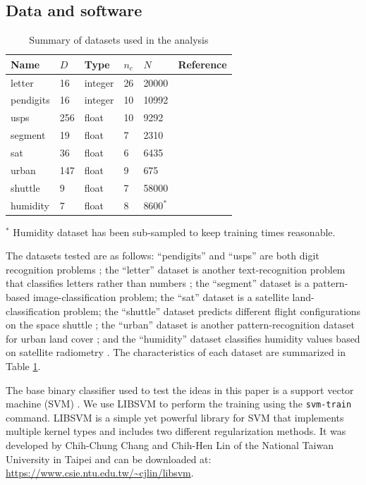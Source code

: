 \subsection{Data and software}

\begin{table}
	\caption{Summary of datasets used in the analysis}\label{datasets}
	\begin{tabular}{|l|lllll|}
	\hline
	Name & $D$ & Type & $n_c$ & $N$ & Reference \\\hline \hline
	letter &  16 & integer & 26 & 20000 & {\small \citep{Frey_Slate1991}}\\
	pendigits & 16 & integer & 10 & 10992 & {\small \citep{Alimoglu1996}}\\
	usps & 256 & float & 10 & 9292 & {\small \citep{Hull1994}}\\
	segment & 19 & float & 7 & 2310 & {\small \citep{King_etal1995}} \\
	sat & 36 & float & 6 & 6435 & {\small \citep{King_etal1995}}\\
	urban & 147 & float & 9 & 675 & {\small \citep{Johnson2013}} \\
	shuttle & 9 & float & 7 & 58000 & {\small \citep{King_etal1995}}\\
	humidity & 7 & float & 8 & 8600$^*$ & {\small \citep{Mills2009}} \\
	\hline
\end{tabular}
	\vspace{1 ex}

	\raggedright $^*$ Humidity dataset has been sub-sampled to keep training times reasonable.
\end{table}

The datasets tested are as follows: 
``pendigits'' and ``usps'' are both digit recognition problems 
\citep{Alimoglu1996, Hull1994};
the ``letter'' dataset is another text-recognition problem 
that classifies letters rather than numbers 
\citep{Frey_Slate1991};
the ``segment'' dataset is a pattern-based image-classification problem;
the ``sat'' dataset is a satellite land-classification problem;
the ``shuttle'' dataset predicts different flight configurations on the
space shuttle \citep{Michie_etal1994, King_etal1995};
the ``urban'' dataset is another pattern-recognition dataset for urban land cover
\citep{Johnson2013};
and the ``humidity'' dataset classifies humidity values based on satellite
radiometry \citep{Mills2009}.
The characteristics of each dataset are summarized in Table \ref{datasets}.

The base binary classifier used to test the ideas in this paper is a 
support vector machine (SVM) \citep{Mueller_etal2001}.
We use LIBSVM \citep{Chang_Lin2011} to perform the training
using the \verb/svm-train/ command.
LIBSVM is a simple yet powerful library for SVM that implements multiple
kernel types and includes two different regularization methods.
It was developed by Chih-Chung Chang and Chih-Hen Lin of the National
Taiwan University in Taipei
and can be downloaded at: \url{https://www.csie.ntu.edu.tw/~cjlin/libsvm}.

